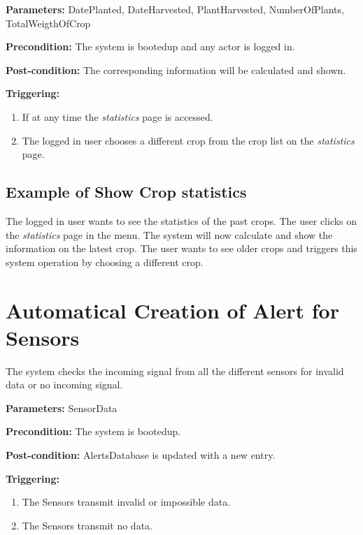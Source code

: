 \begin{description}

\item \textbf{Parameters:} DatePlanted, DateHarvested, PlantHarvested,
NumberOfPlants, TotalWeigthOfCrop
\item \textbf{Precondition:} The system is bootedup and any actor is logged in.
\item \textbf{Post-condition:} The corresponding information will be calculated
and shown.

\item \textbf{Triggering:}
\begin{enumerate}
\item If at any time the \emph{statistics} page is accessed.
\item The logged in user chooses a different crop from the crop list on the
\emph{statistics} page.
\end{enumerate}
\end{description}


\subsection{Example of Show Crop statistics}
The logged in user wants to see the statistics of the past crops.
The user clicks on the \emph{statistics} page in the menu.
The system will now calculate and show the information on the latest crop.
The user wants to see older crops and triggers this system operation by choosing
a different crop.


\break
\section{Automatical Creation of Alert for Sensors}
\label{operation:AddAlertForSensors}
The system checks the incoming signal from all the different sensors for invalid
data or no incoming signal.

\begin{description}

\item \textbf{Parameters:} SensorData
\item \textbf{Precondition:} The system is bootedup.
\item \textbf{Post-condition:} AlertsDatabase is updated with a new entry.

\item \textbf{Triggering:}
\begin{enumerate}
\item The Sensors transmit invalid or impossible data.
\item The Sensors transmit no data.
\end{enumerate}
\end{description}

